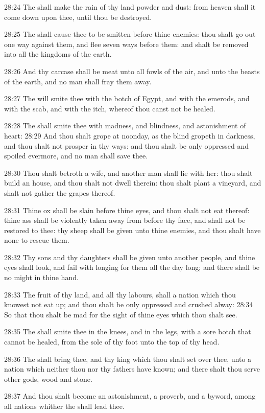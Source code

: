 28:24 The \LORD shall make the rain of thy land powder and dust: from heaven shall it come down upon thee, until thou be destroyed.

28:25 The \LORD shall cause thee to be smitten before thine enemies: thou shalt go out one way against them, and flee seven ways before them: and shalt be removed into all the kingdoms of the earth.

28:26 And thy carcase shall be meat unto all fowls of the air, and unto the beasts of the earth, and no man shall fray them away.

28:27 The \LORD will smite thee with the botch of Egypt, and with the emerods, and with the scab, and with the itch, whereof thou canst not be healed.

28:28 The \LORD shall smite thee with madness, and blindness, and astonishment of heart: 28:29 And thou shalt grope at noonday, as the blind gropeth in darkness, and thou shalt not prosper in thy ways: and thou shalt be only oppressed and spoiled evermore, and no man shall save thee.

28:30 Thou shalt betroth a wife, and another man shall lie with her: thou shalt build an house, and thou shalt not dwell therein: thou shalt plant a vineyard, and shalt not gather the grapes thereof.

28:31 Thine ox shall be slain before thine eyes, and thou shalt not eat thereof: thine ass shall be violently taken away from before thy face, and shall not be restored to thee: thy sheep shall be given unto thine enemies, and thou shalt have none to rescue them.

28:32 Thy sons and thy daughters shall be given unto another people, and thine eyes shall look, and fail with longing for them all the day long; and there shall be no might in thine hand.

28:33 The fruit of thy land, and all thy labours, shall a nation which thou knowest not eat up; and thou shalt be only oppressed and crushed alway: 28:34 So that thou shalt be mad for the sight of thine eyes which thou shalt see.

28:35 The \LORD shall smite thee in the knees, and in the legs, with a sore botch that cannot be healed, from the sole of thy foot unto the top of thy head.

28:36 The \LORD shall bring thee, and thy king which thou shalt set over thee, unto a nation which neither thou nor thy fathers have known; and there shalt thou serve other gods, wood and stone.

28:37 And thou shalt become an astonishment, a proverb, and a byword, among all nations whither the \LORD shall lead thee.

